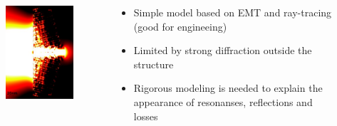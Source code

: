 \documentclass{beamer}
\begin{document}
\begin{frame}
\begin{columns}
\begin{column}{0.5\textwidth}
\begin{figure}[htb]
				\includegraphics[angle=90,width=\textwidth]{../images/multilayer/konc_ene_mgr.png}
			\end{figure}
		\end{column}
		\begin{column}{0.5\textwidth}
			\begin{itemize}
				\item Simple model based on EMT and ray-tracing (good for engineeing)
				\item Limited by strong diffraction outside the structure
				\item Rigorous modeling is needed to explain the appearance of resonanses, reflections and losses
			\end{itemize}
		
		\end{column}
	\end{columns}
		
\end{frame}
\end{document}
